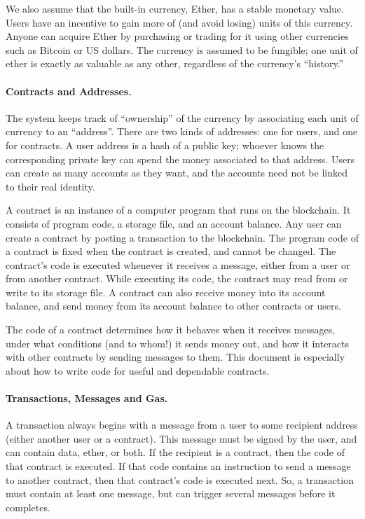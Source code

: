 \documentclass[10pt,twocolumn,letterpaper]{article}
\begin{document}
We also assume that the built-in currency, Ether, has a stable monetary value. Users have an incentive to gain more of (and avoid losing) units of this currency. Anyone can acquire Ether by purchasing or trading for it using other currencies such as Bitcoin or US dollars. The currency is assumed to be fungible; one unit of ether is exactly as valuable as any other, regardless of the currency's ``history.''

\paragraph{Contracts and Addresses.}
The system keeps track of ``ownership'' of the currency by associating each unit of currency to an ``address''. There are two kinds of addresses: one for users, and one for contracts. A user address is a hash of a public key; whoever knows the corresponding private key can spend the money associated to that address. Users can create as many accounts as they want, and the accounts need not be linked to their real identity.

A contract is an instance of a computer program that runs on the blockchain. It consists of program code, a storage file, and an account balance.
Any user can create a contract by posting a transaction to the blockchain.
The program code of a contract is fixed when the contract is created, and cannot be changed.
The contract's code is executed whenever it receives a message, either from a user or from another contract.
While executing its code, the contract may read from or write to its storage file.
A contract can also receive money into its account balance, and send money from its account balance to other contracts or users.

The code of a contract determines how it behaves when it receives messages, under what conditions (and to whom!) it sends  money out, and how it interacts with other contracts by sending messages to them. This document is especially about how to write code for useful and dependable contracts.

\paragraph{Transactions, Messages and Gas.}
A transaction always begins with a message from a user to some recipient address (either another user or a contract). This message must be signed by the user, and can contain data, ether, or both. If the recipient is a contract, then the code of that contract is executed. If that code contains an instruction to send a message to another contract, then that contract's code is executed next. So, a transaction must contain at least one message, but can trigger several messages before it completes.
\end{document}
